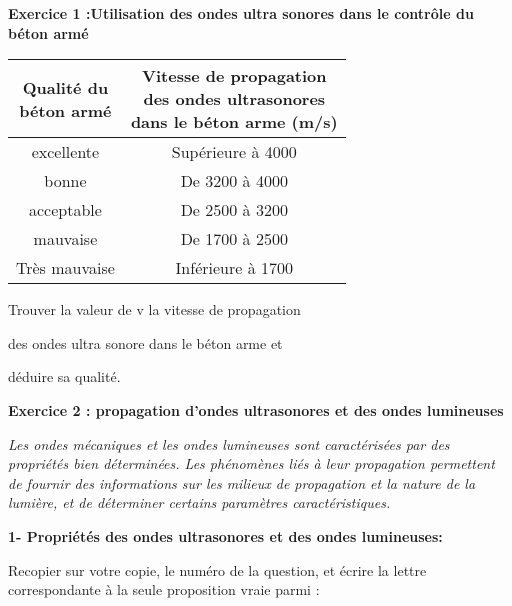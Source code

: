 \documentclass[12pt, french]{article}
\begin{document}
\begin{Box2}{\textbf{Exercice 1 :Utilisation des ondes ultra sonores dans le contrôle du béton armé  }
	}
\begin{tabular}{ |c|c| } 
 \hline
 \makecell{ \textbf{Qualité du}\\\textbf{béton armé}} & \makecell{\textbf{Vitesse de propagation}\\\textbf{des ondes ultrasonores}\\\textbf{dans le béton arme (m/s)} }  \\\hline

 excellente & Supérieure à 4000  \\\hline
 bonne & De 3200 à 4000  \\\hline 
 acceptable & De 2500 à 3200  \\\hline 
 mauvaise & De 1700 à 2500 \\\hline 
 Très mauvaise & Inférieure à 1700  \\\hline 
 \hline
\end{tabular}

Trouver la valeur de v la vitesse de propagation

des ondes ultra sonore dans le béton arme et 

déduire sa qualité.
\end{Box2}
\begin{tcolorbox}\textbf{Exercice 2 : propagation d’ondes ultrasonores et des ondes lumineuses }
\end{tcolorbox}

	\emph{Les ondes mécaniques et les ondes lumineuses sont caractérisées par des propriétés bien
déterminées. Les phénomènes liés à leur propagation permettent de fournir des informations sur
les milieux de propagation et la nature de la lumière, et de déterminer certains paramètres
caractéristiques.}

\textbf{1- Propriétés des ondes ultrasonores et des ondes lumineuses:}

Recopier sur votre copie, le numéro de la question, et écrire la lettre correspondante à la
seule proposition vraie parmi :
\end{document}
